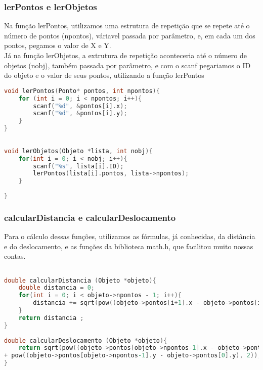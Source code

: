 \documentclass{article}
\begin{document}
\subsubsection{lerPontos e lerObjetos}

Na função lerPontos, utilizamos uma estrutura de repetição que se repete até o número de pontos (npontos), váriavel passada por parâmetro, e, em cada um dos pontos, pegamos o valor de X e Y.
\\Já na função lerObjetos, a extrutura de repetição aconteceria até o número de objetos (nobj), também passada por parâmetro, e com o scanf pegariamos o ID do objeto e o valor de seus pontos, utilizando a função lerPontos
\begin{lstlisting}[caption={Funções lerPontos e lerObjetos},label={lst:cod5},language=C]
void lerPontos(Ponto* pontos, int npontos){
    for (int i = 0; i < npontos; i++){
        scanf("%d", &pontos[i].x);
        scanf("%d", &pontos[i].y);
    }
}
    
    
void lerObjetos(Objeto *lista, int nobj){
    for(int i = 0; i < nobj; i++){
        scanf("%s", lista[i].ID);
        lerPontos(lista[i].pontos, lista->npontos);
    }
        
}

\end{lstlisting}

\subsubsection{calcularDistancia e calcularDeslocamento}

Para o cálculo dessas funções, utilizamos as fórmulas, já conhecidas, da distância e do deslocamento, e as funções da biblioteca math.h, que facilitou muito nossas contas.

\begin{lstlisting}[caption={Funções calcularDistancia e calcularDeslocamento},label={lst:cod6},language=C]

double calcularDistancia (Objeto *objeto){
    double distancia = 0;
    for(int i = 0; i < objeto->npontos - 1; i++){
        distancia += sqrt(pow((objeto->pontos[i+1].x - objeto->pontos[i].x), 2) + pow((objeto->pontos[i+1].y - objeto->pontos[i].y), 2));
    }
    return distancia ;
}
    
double calcularDeslocamento (Objeto *objeto){
    return sqrt(pow((objeto->pontos[objeto->npontos-1].x - objeto->pontos[0].x), 2) 
+ pow((objeto->pontos[objeto->npontos-1].y - objeto->pontos[0].y), 2));
}

\end{lstlisting}
\end{document}
